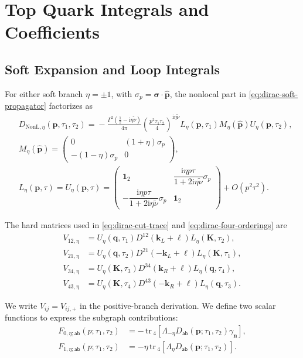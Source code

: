 \documentclass[a4paper,12pt]{article}
\def\mb{\mathbf}
\def\tr{\mathrm{\,tr\,}}
\def\ii{\mathrm{i}}
\def\tn{\tilde\nu}
\def\aa{\mathsf{a}}
\def\bb{\mathsf{b}}
\newcommand{\NL}{\mathrm{NonL}}
\begin{document}
\section{Top Quark Integrals and Coefficients}
\label{app:dirac-top}

\subsection{Soft Expansion and Loop Integrals}
\label{app:dirac-expansion}
For either soft branch $\eta=\pm1$, with $\sigma_p=\bm\sigma\cdot\widehat{\mb p}$, the nonlocal part in \eqref{eq:dirac-soft-propagator} factorizes as
\begin{align}
 &D_{\NL,\eta}(\mb p,\tau_1,\tau_2)
 ={}-\frac{\Gamma^2(\tfrac12-\ii\eta\tn)}{4\pi}
 \left(\frac{p^2\tau_1\tau_2}{4}\right)^{\ii\eta\tn}
 L_\eta(\mb p,\tau_1)M_\eta(\widehat{\mb p})
 U_\eta(\mb p,\tau_2),\nonumber\\
 &M_\eta(\widehat{\mb p})=
 \begin{pmatrix}
 0&(1+\eta)\sigma_p\\
 -(1-\eta)\sigma_p&0
 \end{pmatrix},\nonumber\\
 &L_\eta(\mb p,\tau)=U_\eta(\mb p,\tau)=
 \begin{pmatrix}
 \mathbf1_2&\dfrac{\ii\eta p\tau}{1+2\ii\eta\tn}\sigma_p\\[2mm]
 -\dfrac{\ii\eta p\tau}{1+2\ii\eta\tn}\sigma_p&\mathbf1_2
 \end{pmatrix}
 +O(p^2\tau^2).
 \label{eq:dirac-endpoint-factorization}
\end{align}

The hard matrices used in \eqref{eq:dirac-cut-trace} and \eqref{eq:dirac-four-orderings} are
\begin{align}
 V_{12,\eta}&=U_\eta(\mb q,\tau_1)
 D^{12}(\mb k_L+\bm\ell)L_\eta(\mb K,\tau_2),\nonumber\\
 V_{21,\eta}&=U_\eta(\mb q,\tau_2)
 D^{21}(-\mb k_L+\bm\ell)L_\eta(\mb K,\tau_1),\nonumber\\
 V_{34,\eta}&=U_\eta(\mb K,\tau_3)
 D^{34}(\mb k_R+\bm\ell)L_\eta(\mb q,\tau_4),\nonumber\\
 V_{43,\eta}&=U_\eta(\mb K,\tau_4)
 D^{43}(-\mb k_R+\bm\ell)L_\eta(\mb q,\tau_3).
 \label{eq:dirac-hard-blocks}
\end{align}

We write $V_{ij}=V_{ij,+}$ in the positive-branch derivation.
We define two scalar functions to express the subgraph contributions:
\begin{align}
 F_{0,\eta;\aa\bb}(p;\tau_1,\tau_2)
 &=-\tr_4[\Lambda_{-\eta}D_{\aa\bb}(\mb p;\tau_1,\tau_2)
                      \gamma_{\mb n}],\nonumber\\
 F_{1,\eta;\aa\bb}(p;\tau_1,\tau_2)
 &=-\eta\tr_4[\Lambda_\eta D_{\aa\bb}(\mb p;\tau_1,\tau_2)].
 \label{eq:dirac-hard-kernel-traces}
\end{align}
\end{document}

